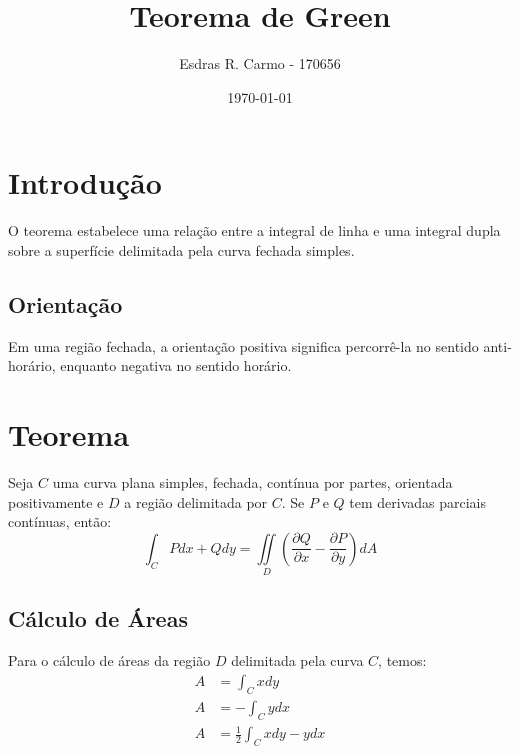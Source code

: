 \documentclass{article}
\author{Esdras R. Carmo - 170656}
\title{Teorema de Green}
\date{\today}
\newcommand{\doubleint}[2] {\iint\limits_{#1} #2}
\newcommand{\PartialDer}[2] {\frac{\partial #1}{\partial #2}}
\begin{document}
    \maketitle
    
    \section{Introdução}
        O teorema estabelece uma relação entre a integral de linha e uma integral dupla
        sobre a superfície delimitada pela curva fechada simples.

        \subsection{Orientação}
            Em uma região fechada, a orientação positiva significa percorrê-la no sentido anti-horário, enquanto
            negativa no sentido horário.

    \section{Teorema}
        Seja $C$ uma curva plana simples, fechada, contínua por partes, orientada positivamente e $D$ a região delimitada
        por $C$. Se $P$ e $Q$ tem derivadas parciais contínuas, então:
        \[
            \int_C Pdx + Qdy = \doubleint{D}{\left( \PartialDer{Q}{x} - \PartialDer{P}{y} \right)} dA
        \]

        \subsection{Cálculo de Áreas}
            Para o cálculo de áreas da região $D$ delimitada pela curva $C$, temos:
            \begin{align*}
                A &= \int_C x dy\\
                A &= - \int_C y dx\\
                A &= \frac{1}{2} \int_C {xdy - ydx}
            \end{align*}
\end{document}
